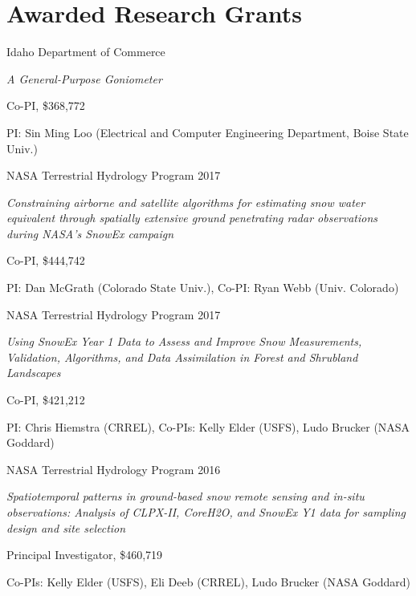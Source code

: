 \documentclass[11pt]{article}
\renewenvironment{itemize}{
  \begin{list}{}{
    \setlength{\leftmargin}{1.5em}
    \setlength{\itemsep}{0pt}
    \setlength{\parskip}{0pt}
  }
}{
  \end{list}
}
\begin{document}
\section*{Awarded Research Grants}
\begin{itemize} 

\item[6/2018-07/2020] Idaho Department of Commerce
\begin{itemize}
\item \textit{A General-Purpose Goniometer}
\item Co-PI, \$368,772
\item PI: Sin Ming Loo (Electrical and Computer Engineering Department, Boise State Univ.)
\end{itemize}

\item [6/2018-6/2021] NASA Terrestrial Hydrology Program 2017
\begin{itemize}
\item \textit{Constraining airborne and satellite algorithms for estimating snow water equivalent through spatially extensive ground penetrating radar observations during NASA's SnowEx campaign}
\item Co-PI, \$444,742
\item PI: Dan McGrath (Colorado State Univ.), Co-PI: Ryan Webb (Univ. Colorado)
\end{itemize}

\item [6/2018-6/2021] NASA Terrestrial Hydrology Program 2017
\begin{itemize}
\item \textit{Using SnowEx Year 1 Data to Assess and Improve Snow Measurements, Validation, Algorithms, and Data Assimilation in Forest and Shrubland Landscapes}
\item Co-PI, \$421,212
\item PI: Chris Hiemstra (CRREL), Co-PIs: Kelly Elder (USFS), Ludo Brucker (NASA Goddard)
\end{itemize}

\item [6/2017-6/2022] NASA Terrestrial Hydrology Program 2016
\begin{itemize}
\item \textit{Spatiotemporal patterns in ground-based snow remote sensing and in-situ observations: Analysis of CLPX-II, CoreH2O, and SnowEx Y1 data for sampling design and site selection}
\item Principal Investigator, \$460,719
\item Co-PIs: Kelly Elder (USFS), Eli Deeb (CRREL), Ludo Brucker (NASA Goddard)
\end{itemize}


\end{itemize}
\end{document}
